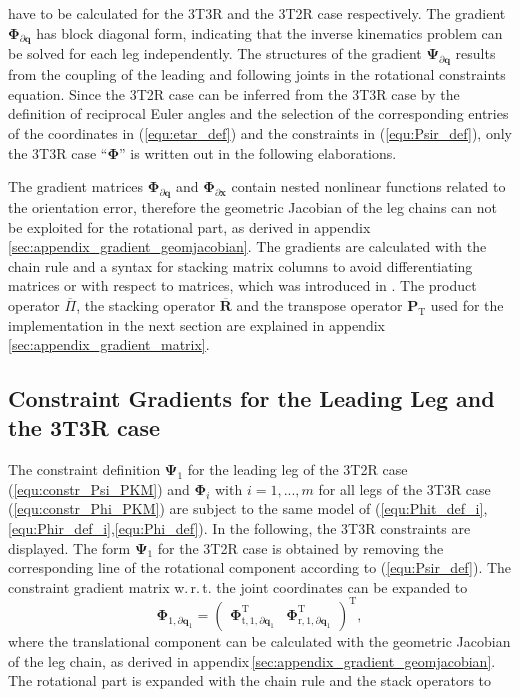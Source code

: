 \documentclass[robotics,article,submit,moreauthors,pdftex]{Definitions/mdpi}
\newcommand{\bm}[1]{\boldsymbol{#1}}
\newcommand{\transp}[0]{{\mathrm{T}}}
\begin{document}
%
have to be calculated for the 3T3R and the 3T2R case respectively.
The gradient $\bm{\Phi}_{\partial \bm{q}}$ has block diagonal form, indicating that the inverse kinematics problem can be solved for each leg independently.
The structures of the gradient $\bm{\Psi}_{\partial \bm{q}}$ results from the coupling of the leading and following joints in the rotational constraints equation.
\color{gray}
Since the 3T2R case can be inferred from the 3T3R case by the definition of reciprocal Euler angles and the selection of the corresponding entries of the coordinates in (\ref{equ:etar_def}) and the constraints in (\ref{equ:Psir_def}), only the 3T3R case ``$\bm{\Phi}$'' is written out in the following elaborations.
\color{black}

The gradient matrices $\bm{\Phi}_{\partial \bm{q}}$ and $\bm{\Phi}_{\partial \bm{x}}$ contain nested nonlinear functions related to the orientation error, therefore the geometric Jacobian of the leg chains can not be exploited for the rotational part, as derived in appendix\,\ref{sec:appendix_gradient_geomjacobian}.
The gradients are calculated with the chain rule and a syntax for stacking matrix columns to avoid differentiating matrices or with respect to matrices, which was introduced in \cite{1_SchapplerTapOrt2019}.
The product operator $\overline{\Pi}$, the stacking operator $\overline{\bm{R}}$ and the transpose operator $\bm{P}_\transp$ used for the implementation in the next section are explained in appendix\, \ref{sec:appendix_gradient_matrix}.

\subsection{Constraint Gradients for the Leading Leg and the 3T3R case}
%
The constraint definition $\bm{\Psi}_1$ for the leading leg of the 3T2R case (\ref{equ:constr_Psi_PKM}) and $\bm{\Phi}_i$ with $i=1,...,m$ for all legs of the 3T3R case (\ref{equ:constr_Phi_PKM}) are subject to the same model of (\ref{equ:Phit_def_i},\ref{equ:Phir_def_i},\ref{equ:Phi_def}).
In the following, the 3T3R constraints are displayed.
The form $\bm{\Psi}_1$ for the 3T2R case is obtained by removing the corresponding line of the rotational component according to (\ref{equ:Psir_def}).
The constraint gradient matrix w.\,r.\,t. the joint coordinates can be expanded to
%
\begin{equation}
\bm{\Phi}_{1,\partial\bm{q}_1}
=
\begin{pmatrix}
\bm{\Phi}_{\mathrm{t},1,\partial\bm{q}_1}^\transp
&
\bm{\Phi}_{\mathrm{r},1,\partial\bm{q}_1}^\transp
\end{pmatrix}^\transp,
\label{equ:Phi_1_grad_q}
\end{equation}
%
where the translational component can be calculated with the geometric Jacobian of the leg chain, as derived in appendix\,\ref{sec:appendix_gradient_geomjacobian}. %
The rotational part is expanded with the chain rule and the stack operators to
\end{document}
